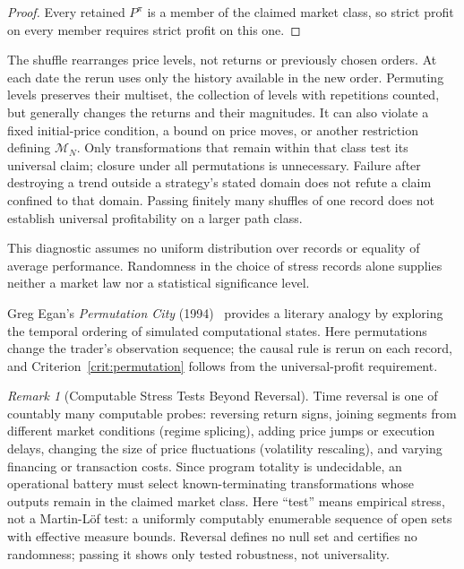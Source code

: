 \documentclass[aps,pra,reprint,superscriptaddress,amsmath,amssymb,floatfix]{revtex4-2}
\theoremstyle{plain}
\theoremstyle{definition}
\theoremstyle{remark}
\newtheorem{remark}{Remark}
\begin{document}
\begin{proof}
Every retained \(P^\pi\) is a member of the claimed market class, so strict
profit on every member requires strict profit on this one.
\end{proof}

The shuffle rearranges price levels, not returns or previously chosen orders.
At each date the rerun uses only the history available in the new order.
Permuting levels preserves their multiset, the collection of levels with
repetitions counted, but generally changes the returns and their magnitudes. It can also violate a fixed initial-price condition,
a bound on price moves, or another restriction defining \(\mathcal M_N\).
Only transformations that remain within that class test its universal claim;
closure under all permutations is unnecessary. Failure after destroying a
trend outside a strategy's stated domain does not refute a claim confined to
that domain. Passing finitely many shuffles of one record does not establish
universal profitability on a larger path class.

This diagnostic assumes no uniform distribution over records or equality of
average performance. Randomness in the choice of stress records
alone supplies neither a market law nor a statistical significance level.

Greg Egan's \emph{Permutation City} (1994)~\cite{permutationcity} provides a
literary analogy by exploring the temporal ordering of simulated computational
states. Here permutations change the trader's observation sequence; the causal
rule is rerun on each record, and Criterion~\ref{crit:permutation} follows from
the universal-profit requirement.

\begin{remark}[Computable Stress Tests Beyond Reversal]
\label{rem:stressfamily}
Time reversal is one of countably many computable probes: reversing return
signs, joining segments from different market conditions (regime splicing),
adding price jumps or execution delays, changing the size of price
fluctuations (volatility rescaling), and varying financing or transaction costs. Since program totality is undecidable, an operational battery must select
known-terminating transformations whose outputs remain in the claimed market
class. Here ``test'' means empirical stress, not a Martin-L\"of test: a uniformly
computably enumerable sequence of open sets with effective measure bounds.
Reversal defines no null set and certifies no randomness; passing it shows only
tested robustness, not universality.
\end{remark}
\end{document}
